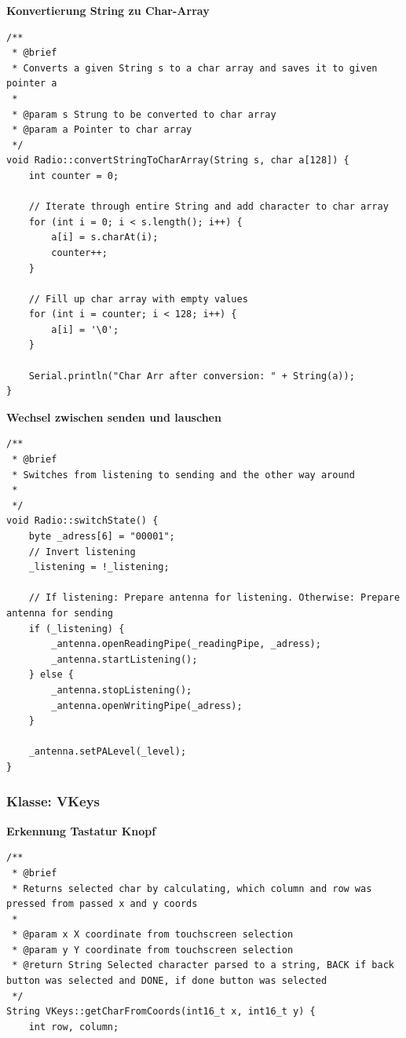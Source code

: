 \documentclass[a4paper, 11pt]{scrartcl}
\begin{document}
\begin{small}
\begin{flushleft}\textbf{Konvertierung String zu Char-Array}\label{code:transpose_s_to_arr}\end{flushleft}
\begin{lstlisting}
/**
 * @brief
 * Converts a given String s to a char array and saves it to given pointer a
 * 
 * @param s Strung to be converted to char array
 * @param a Pointer to char array
 */
void Radio::convertStringToCharArray(String s, char a[128]) {
    int counter = 0;

    // Iterate through entire String and add character to char array
    for (int i = 0; i < s.length(); i++) {
        a[i] = s.charAt(i);
        counter++;
    }

    // Fill up char array with empty values
    for (int i = counter; i < 128; i++) {
        a[i] = '\0';
    }

    Serial.println("Char Arr after conversion: " + String(a));
}
\end{lstlisting}

\begin{flushleft}\textbf{Wechsel zwischen senden und lauschen}\label{code:switch}\end{flushleft}
\begin{lstlisting}
/**
 * @brief 
 * Switches from listening to sending and the other way around
 * 
 */
void Radio::switchState() {
    byte _adress[6] = "00001";
    // Invert listening
    _listening = !_listening;

    // If listening: Prepare antenna for listening. Otherwise: Prepare antenna for sending
    if (_listening) {
        _antenna.openReadingPipe(_readingPipe, _adress);
        _antenna.startListening();
    } else {
        _antenna.stopListening();
        _antenna.openWritingPipe(_adress);
    }

    _antenna.setPALevel(_level);
}
\end{lstlisting}

\subsubsection{Klasse: VKeys}
\begin{flushleft}
    \textbf{Erkennung Tastatur Knopf}\label{code:keys}
\end{flushleft}
\begin{lstlisting}
/**
 * @brief 
 * Returns selected char by calculating, which column and row was pressed from passed x and y coords
 * 
 * @param x X coordinate from touchscreen selection
 * @param y Y coordinate from touchscreen selection
 * @return String Selected character parsed to a string, BACK if back button was selected and DONE, if done button was selected
 */
String VKeys::getCharFromCoords(int16_t x, int16_t y) {
    int row, column;


\end{lstlisting}
\end{small}
\end{document}
